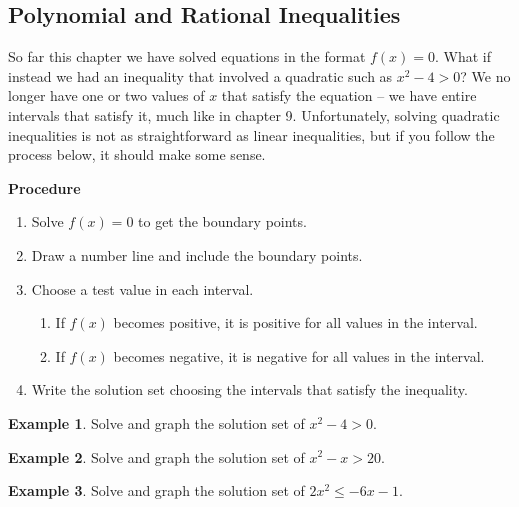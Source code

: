 \documentclass[addpoints,12pt]{exam}
\theoremstyle{definition}
\theoremstyle{break}
\theoremstyle{break}
\newtheorem{example}{Example}[subsection]
\begin{document}
\setcounter{section}{11}
\setcounter{subsection}{4}

\subsection{Polynomial and Rational Inequalities}
\vspace{.15in}

So far this chapter we have solved equations in the format $f(x) = 0$. What if instead we had an inequality that involved a quadratic such as $x^2 - 4 > 0$? We no longer have one or two values of $x$ that satisfy the equation -- we have entire intervals that satisfy it, much like in chapter 9. Unfortunately, solving quadratic inequalities is not as straightforward as linear inequalities, but if you follow the process below, it should make some sense.
\vspace{.15in}

\begin{mdframed}
\textbf{Procedure}
\begin{enumerate}
\item Solve $f(x) = 0$ to get the boundary points.
\item Draw a number line and include the boundary points.
\item Choose a test value in each interval.
\begin{enumerate}
\item If $f(x)$ becomes positive, it is positive for all values in the interval.
\item If $f(x)$ becomes negative, it is negative for all values in the interval.
\end{enumerate}
\item Write the solution set choosing the intervals that satisfy the inequality.
\end{enumerate}
\end{mdframed}

\begin{example}
Solve and graph the solution set of $x^2 - 4 > 0$.
\end{example}

\newpage

\begin{example}
Solve and graph the solution set of $x^2 - x > 20$.
\end{example}

\newpage

\begin{example}
Solve and graph the solution set of $2x^2 \le -6x - 1$.
\end{example}
\end{document}
